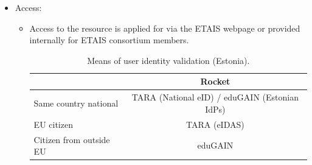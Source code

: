 \documentclass{article}
\begin{document}
\begin{itemize}
\item[]Access:
\begin{itemize} 
\item[] Access to the resource is applied for via the ETAIS webpage or provided internally for ETAIS consortium members.

\begin{table}[!h]
    \centering
    \begin{tabular}{|l|c|}
        \hline
    & Rocket  \\
    \hline
  Same country national      & TARA (National eID) / eduGAIN (Estonian IdPs) \\
    \hline
    EU citizen       & TARA (eIDAS) \\
        \hline
        Citizen from outside EU	         & eduGAIN \\
        \hline
        \end{tabular}
    \caption{Means of user identity validation (Estonia).}
    \label{tab:ET_user_acc_val}
\end{table}
\end{itemize} 
\end{itemize} 
\end{document}
